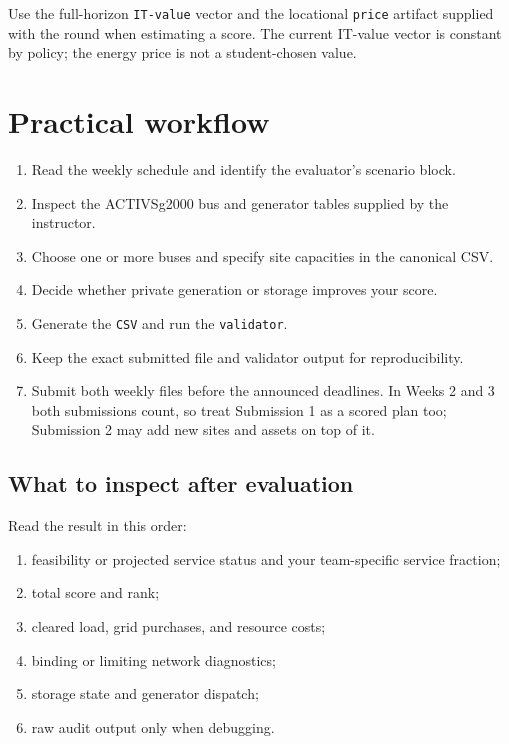 \documentclass[12pt]{article}
\newcommand{\code}[1]{\texttt{#1}}
\begin{document}
Use the full-horizon \code{IT-value} vector and the locational \code{price}
artifact supplied with the round when estimating a score. The current IT-value
vector is constant by policy; the energy price is not a student-chosen value.

\section{Practical workflow}
\begin{enumerate}[leftmargin=*]
  \item Read the weekly schedule and identify the evaluator's scenario block.
  \item Inspect the ACTIVSg2000 bus and generator tables supplied by the instructor.
  \item Choose one or more buses and specify site capacities in the canonical CSV.
  \item Decide whether private generation or storage improves your score.
  \item Generate the \code{CSV} and run the \code{validator}.
  \item Keep the exact submitted file and validator output for reproducibility.
  \item Submit both weekly files before the announced deadlines. In Weeks 2
  and 3 both submissions count, so treat Submission 1 as a scored plan too;
  Submission 2 may add new sites and assets on top of it.
\end{enumerate}

\subsection{What to inspect after evaluation}
Read the result in this order:
\begin{enumerate}[leftmargin=*]
  \item feasibility or projected service status and your team-specific service fraction;
  \item total score and rank;
  \item cleared load, grid purchases, and resource costs;
  \item binding or limiting network diagnostics;
  \item storage state and generator dispatch;
  \item raw audit output only when debugging.
\end{enumerate}
\end{document}
